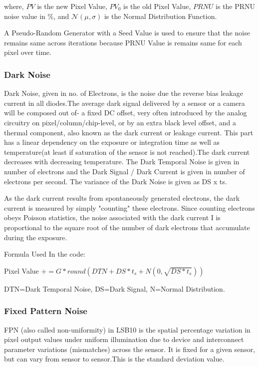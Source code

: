 where, $PV$ is the new Pixel Value, $PV_0$ is the old Pixel Value, $PRNU$ is the PRNU noise value in \%, and $\mathcal{N}(\mu, \sigma)$ is the Normal Distribution Function.

A Pseudo-Random Generator with a Seed Value is used to ensure that the noise remains same across iterations because PRNU Value is remains same for each pixel over time. 


\subsubsection{Dark Noise} %
Dark Noise, given in no. of Electrons, is the noise due the reverse bias leakage current in
all diodes.The average dark signal delivered by a sensor or a camera will be composed out of- a fixed DC offset, very often introduced by the analog circuitry on pixel/column/chip-level, or by an
extra black level offset, and a thermal component, also known as the dark current or leakage current. This part has a linear dependency on the exposure or integration time as well as temperature(at least if saturation of the sensor is not reached).The dark current decreases with decreasing temperature.
The Dark Temporal Noise is given in number of electrons and the Dark Signal / Dark Current is
given in number of electrons per second. The variance of the Dark Noise is given as DS x ts.

As the dark current results from spontaneously generated electrons, the dark current is measured by simply "counting" these electrons. Since counting electrons obeys Poisson statistics, the noise associated with the dark current I is proportional to the square root of the number of dark electrons that accumulate during the exposure. 

Formula Used In the code:  

Pixel Value $+= G * round(DTN + DS * t_s + N(0,\sqrt{DS *t_s}))$

DTN=Dark Temporal Noise, DS=Dark Signal, N=Normal Distribution.


\subsubsection{Fixed Pattern Noise} %
FPN (also called non-uniformity) in LSB10 is the spatial percentage variation in pixel output values under uniform illumination due to device and interconnect parameter variations (mismatches) across the sensor. It is fixed for a given sensor, but can vary from sensor to sensor.This is the standard deviation value.

